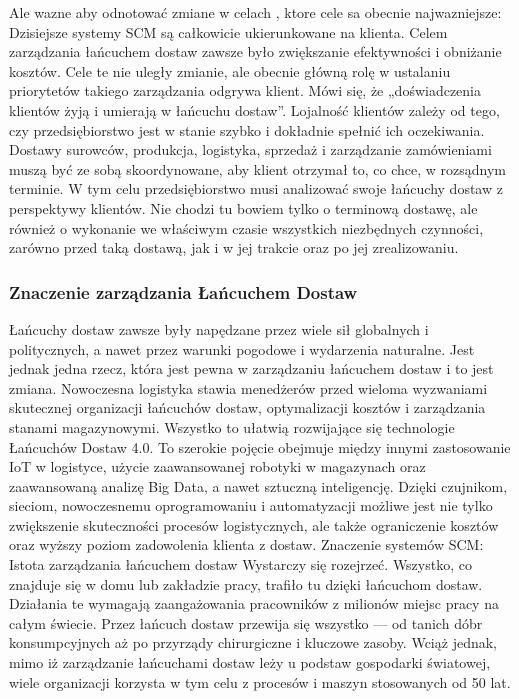 Ale wazne aby odnotować zmiane w celach , ktore cele sa obecnie najwazniejsze:
 Dzisiejsze systemy SCM są całkowicie ukierunkowane na klienta.
Celem zarządzania łańcuchem dostaw zawsze było zwiększanie efektywności i obniżanie kosztów. Cele te nie uległy zmianie, ale obecnie główną rolę w ustalaniu priorytetów takiego zarządzania odgrywa klient. Mówi się, że „doświadczenia klientów żyją i umierają w łańcuchu dostaw”.
Lojalność klientów zależy od tego, czy przedsiębiorstwo jest w stanie szybko i dokładnie spełnić ich oczekiwania. Dostawy surowców, produkcja, logistyka, sprzedaż i zarządzanie zamówieniami muszą być ze sobą skoordynowane, aby klient otrzymał to, co chce, w rozsądnym terminie. W tym celu przedsiębiorstwo musi analizować swoje łańcuchy dostaw z perspektywy klientów. Nie chodzi tu bowiem tylko o terminową dostawę, ale również o wykonanie we właściwym czasie wszystkich niezbędnych czynności, zarówno przed taką dostawą, jak i w jej trakcie oraz po jej zrealizowaniu.\cite{oracle2023}


\vspace{\baselineskip}
\subsubsection{Znaczenie zarządzania Łańcuchem Dostaw}

Łańcuchy dostaw zawsze były napędzane przez wiele sił globalnych i politycznych, a nawet przez warunki pogodowe i wydarzenia naturalne. Jest jednak jedna rzecz, która jest pewna w zarządzaniu łańcuchem dostaw i to jest zmiana. 
Nowoczesna logistyka stawia menedżerów przed wieloma wyzwaniami skutecznej organizacji łańcuchów dostaw, optymalizacji kosztów i zarządzania stanami magazynowymi. Wszystko to ułatwią rozwijające się technologie Łańcuchów Dostaw 4.0. To szerokie pojęcie obejmuje między innymi zastosowanie IoT w logistyce, użycie zaawansowanej robotyki w magazynach oraz zaawansowaną analizę Big Data, a nawet sztuczną inteligencję. Dzięki czujnikom, sieciom, nowoczesnemu oprogramowaniu i automatyzacji możliwe jest nie tylko zwiększenie skuteczności procesów logistycznych, ale także ograniczenie kosztów oraz wyższy poziom zadowolenia klienta z dostaw.
Znaczenie systemów SCM: Istota zarządzania łańcuchem dostaw
Wystarczy się rozejrzeć. Wszystko, co znajduje się w domu lub zakładzie pracy, trafiło tu dzięki łańcuchom dostaw. Działania te wymagają zaangażowania pracowników z milionów miejsc pracy na całym świecie. Przez łańcuch dostaw przewija się wszystko — od tanich dóbr konsumpcyjnych aż po przyrządy chirurgiczne i kluczowe zasoby. Wciąż jednak, mimo iż zarządzanie łańcuchami dostaw leży u podstaw gospodarki światowej, wiele organizacji korzysta w tym celu z procesów i maszyn stosowanych od 50 lat.\cite{scm2023}

